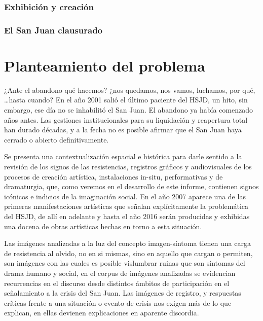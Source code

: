 \subsubsection{Exhibición y creación}

\subsubsection{El San Juan clausurado}



\section*{Planteamiento del problema }
¿Ante el abandono qué hacemos? ¿nos quedamos, nos vamos, luchamos, por qué, …hasta cuando? En el año 2001 salió el último paciente del HSJD, un hito, sin embargo, ese día no se inhabilitó el San Juan. El abandono ya había comenzado años antes. Las gestiones institucionales para su liquidación y reapertura total han durado décadas, y a la fecha no es posible afirmar que el San Juan haya cerrado o abierto definitivamente.

Se presenta una contextualización espacial e histórica para darle sentido a la revisión de los signos de las resistencias, registros gráficos y audiovisuales de los procesos de creación artística, instalaciones in-situ, performativas y de dramaturgia, que, como veremos en el desarrollo de este informe, contienen signos icónicos e indicios de la imaginación social. En el año 2007 aparece una de las primeras manifestaciones artísticas que señalan explícitamente la problemática del HSJD, de allí en adelante y hasta el año 2016 serán producidas y exhibidas una docena de obras artísticas hechas en torno a esta situación.

Las imágenes analizadas a la luz del concepto imagen-síntoma tienen una carga de resistencia al olvido, no en si mismas, sino en aquello que cargan o permiten, son imágenes con las cuales es posible vislumbrar ruinas que son síntomas del drama humano y social, en el corpus de imágenes analizadas se evidencian recurrencias en el discurso desde distintos ámbitos de participación en el señalamiento a la crisis del San Juan. Las imágenes de registro, y respuestas críticas frente a una situación o evento de crisis nos exigen más de lo que explican, en ellas devienen explicaciones en aparente discordia.



